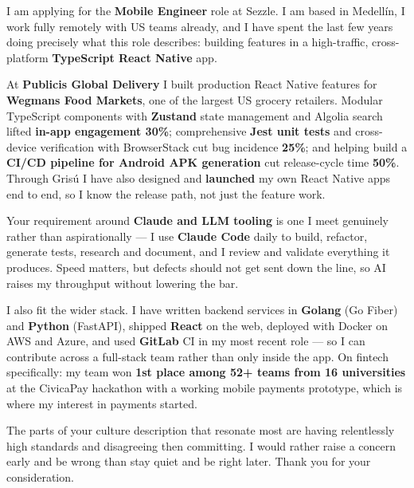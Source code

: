\documentclass[11pt,a4paper]{awesome-cv}
\begin{document}
\makecvheader[R]
\makelettertitle

\begin{cvletter}

I am applying for the \textbf{Mobile Engineer} role at Sezzle. I am based in Medellín, I work fully remotely with US teams already, and I have spent the last few years doing precisely what this role describes: building features in a high-traffic, cross-platform \textbf{TypeScript React Native} app.

At \textbf{Publicis Global Delivery} I built production React Native features for \textbf{Wegmans Food Markets}, one of the largest US grocery retailers. Modular TypeScript components with \textbf{Zustand} state management and Algolia search lifted \textbf{in-app engagement 30\%}; comprehensive \textbf{Jest unit tests} and cross-device verification with BrowserStack cut bug incidence \textbf{25\%}; and helping build a \textbf{CI/CD pipeline for Android APK generation} cut release-cycle time \textbf{50\%}. Through Grisú I have also designed and \textbf{launched} my own React Native apps end to end, so I know the release path, not just the feature work.

Your requirement around \textbf{Claude and LLM tooling} is one I meet genuinely rather than aspirationally --- I use \textbf{Claude Code} daily to build, refactor, generate tests, research and document, and I review and validate everything it produces. Speed matters, but defects should not get sent down the line, so AI raises my throughput without lowering the bar.

I also fit the wider stack. I have written backend services in \textbf{Golang} (Go Fiber) and \textbf{Python} (FastAPI), shipped \textbf{React} on the web, deployed with Docker on AWS and Azure, and used \textbf{GitLab} CI in my most recent role --- so I can contribute across a full-stack team rather than only inside the app. On fintech specifically: my team won \textbf{1st place among 52+ teams from 16 universities} at the CivicaPay hackathon with a working mobile payments prototype, which is where my interest in payments started.

The parts of your culture description that resonate most are having relentlessly high standards and disagreeing then committing. I would rather raise a concern early and be wrong than stay quiet and be right later. Thank you for your consideration.

\end{cvletter}

\makeletterclosing
\end{document}
